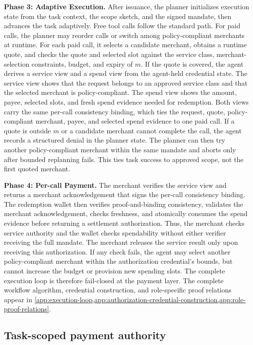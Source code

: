 \documentclass[letterpaper]{article}
\begin{document}
\noindent\textbf{Phase 3: Adaptive Execution.}
After issuance, the planner initializes execution state from the task context, the scope sketch,
and the signed mandate, then advances the task adaptively. Free tool calls
follow the standard path. For paid calls, the planner may reorder calls or
switch among policy-compliant merchants at runtime. For each paid call, it
selects a candidate merchant, obtains a runtime quote, and checks the quote and
selected slot against the service class, merchant-selection constraints,
budget, and expiry of \(m\). If the quote is covered, the agent derives a
service view and a spend view from the agent-held credential state. The service
view shows that the request belongs to an approved service class and that the
selected merchant is policy-compliant. The spend view shows the amount, payee,
selected slots, and fresh spend evidence needed for redemption. Both views
carry the same per-call consistency binding, which ties the request, quote,
policy-compliant merchant, payee, and selected spend evidence to one paid call.
If a quote is outside \(m\) or a candidate merchant cannot complete the call,
the agent records a structured denial in the planner state.
The planner can then try another policy-compliant merchant within the same mandate and
aborts only after bounded replanning fails. This ties task success to approved
scope, not the first quoted merchant.

\noindent\textbf{Phase 4: Per-call Payment.}
The merchant verifies the service view and returns a merchant acknowledgement
that signs the per-call consistency binding. The redemption wallet then verifies
proof-and-binding consistency, validates the merchant acknowledgement, checks
freshness, and atomically consumes the spend evidence
before returning a settlement authorization. Thus, the merchant checks service
authority and the wallet checks spendability without either verifier receiving
the full mandate. The merchant releases the service
result only upon receiving this authorization. If any check fails, the agent may
select another policy-compliant merchant within the authorization credential's bounds,
but cannot increase the budget or provision new spending slots. The complete
execution loop is therefore fail-closed at the payment layer.
The complete workflow algorithm, credential construction, and role-specific
proof relations appear in
\cref{app:execution-loop,app:authorization-credential-construction,app:role-proof-relations}.

\subsection{Task-scoped payment authority}
\label{sec:task-scoped-payment-authority}
\end{document}
